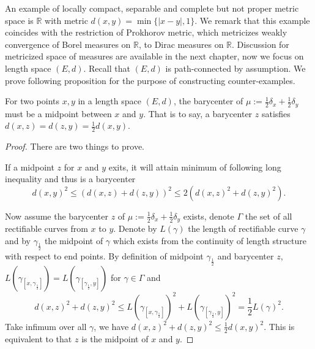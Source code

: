 
An example of locally compact,
separable and complete but not proper metric space is $\mathbb{R}$ with metric $d(x,y)=\min\{|x-y|,1\}$.
We remark that this example coincides with the restriction of Prokhorov metric, which metricizes weakly convergence of Borel measures on $\mathbb{R}$, to Dirac measures on $\mathbb{R}$.
Discussion for metricized space of measures are available in the next chapter,
now we focus on length space $(E,d)$. Recall that $(E,d)$ is path-connected by assumption.
We prove following proposition for the purpose of constructing counter-examples.

\begin{prop}
	\label{prop:barycenter_midpoint}
	For two points $x,y$ in a length space $(E,d)$, the barycenter of $\mu:=\frac{1}{2}\delta_x + \frac{1}{2}\delta_y$ must be a midpoint between $x$ and $y$. That is to say, a barycenter $z$ satisfies $d(x,z)=d(z,y)=\frac{1}{2}d(x,y)$.
\end{prop}

\begin{proof}
	There are two things to prove.

	If a midpoint $z$ for $x$ and $y$ exits,
	it will attain minimum of following long inequality and thus is a barycenter
	\[
		d(x,y)^2 \leq \left(d(x,z) + d(z,y)\right)^2 \leq 2\left(d(x,z)^2+ d(z,y)^2\right).
	\]

	Now assume the barycenter $z$ of $\mu:=\frac{1}{2}\delta_x + \frac{1}{2} \delta_y$ exists,
	denote $\Gamma$ the set of all rectifiable curves from $x$ to $y$.
	Denote by $L(\gamma)$ the length of rectifiable curve $\gamma$
	and by $\gamma_\frac{1}{2}$ the midpoint of $\gamma$ which exists from the continuity of length
	structure with respect to end points.
	By definition of midpoint $\gamma_{\frac{1}{2}}$ and barycenter $z$,
	$L(\gamma_{[x, \gamma_\frac{1}{2}]}) = L(\gamma_{[\gamma_\frac{1}{2}, y]})$ for $\gamma \in \Gamma$ and
	\[
		d(x,z)^2 + d(z,y)^2 \leq {L(\gamma_{[x, \gamma_\frac{1}{2}]})}^2 + {L(\gamma_{[\gamma_\frac{1}{2}, y]})}^2=\frac{1}{2} {L(\gamma)}^2.
	\]
	Take infimum over all $\gamma$, we have $d(x,z)^2 + d(z,y)^2 \leq \frac{1}{2}d(x,y)^2$.
	This is equivalent to that $z$ is the midpoint of $x$ and $y$.
\end{proof}


